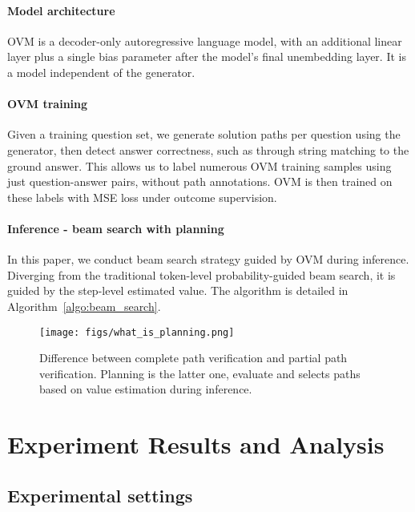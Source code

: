 \documentclass[11pt]{article}
\theoremstyle{plain}
\theoremstyle{claim}
\theoremstyle{rethinking}
\theoremstyle{researchquestion}
\theoremstyle{findings}
\theoremstyle{fact}
\theoremstyle{proper}
\theoremstyle{remark}
\begin{document}
\paragraph{Model architecture} 
OVM is a decoder-only autoregressive language model, with an additional linear layer plus a single bias parameter after the model's final unembedding layer. It is a model independent of the generator.

\paragraph{OVM training}
Given a training question set, we generate  solution paths per question using the generator, then detect answer correctness, such as through string matching to the ground answer. This allows us to label numerous OVM training samples using just question-answer pairs, without path annotations. OVM is then trained on these labels with MSE loss under outcome supervision.


\paragraph{Inference - beam search with planning}
In this paper, we conduct beam search strategy guided by OVM during inference. Diverging from the traditional token-level probability-guided beam search, it is guided by the step-level estimated value. The algorithm is detailed in Algorithm~\ref{algo:beam_search}.









\begin{figure*}
    \centering
    \texttt{[image: figs/what\_is\_planning.png]}
    \caption{\label{fig:what_is_planning} Difference between complete path verification and partial path verification. Planning is the latter one, evaluate and selects paths based on value estimation during inference.}
\end{figure*}







\section{Experiment Results and Analysis}

\subsection{Experimental settings}
\end{document}
